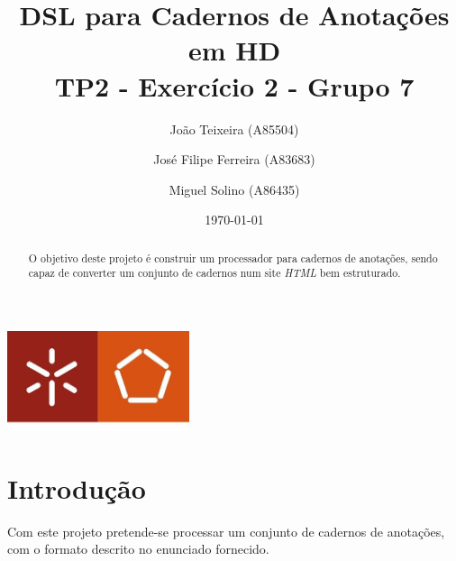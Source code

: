 \documentclass[a4paper]{report}
\begin{document}
\title{DSL para Cadernos de Anotações em HD \\
\large TP2 - Exercício 2 - Grupo 7}
\author{João Teixeira (A85504) \and José Filipe Ferreira (A83683) \and Miguel
Solino (A86435)}
\date{\today}

\begin{center}
    \begin{minipage}{0.75\linewidth}
        \centering
        \includegraphics[width=0.4\textwidth]{eng.jpeg}\par\vspace{1cm}
        \vspace{1.5cm}
        \href{https://www.uminho.pt/PT}
        {\color{black}{\scshape\LARGE Universidade do Minho}} \par
        \vspace{1cm}
        \href{https://www.di.uminho.pt/}
        {\color{black}{\scshape\Large Departamento de Informática}} \par
        \vspace{1.5cm}
        \maketitle
    \end{minipage}
\end{center}

\begin{abstract}
    \begin{center}
        O objetivo deste projeto é construir um processador para cadernos de
        anotações, sendo capaz de converter um conjunto de cadernos num 
        site \textit{HTML} bem estruturado.
    \end{center}
\end{abstract}

\tableofcontents

\pagebreak

\chapter{Introdução}
Com este projeto pretende-se processar um conjunto de cadernos de anotações, com
o formato descrito no enunciado fornecido.
\end{document}
